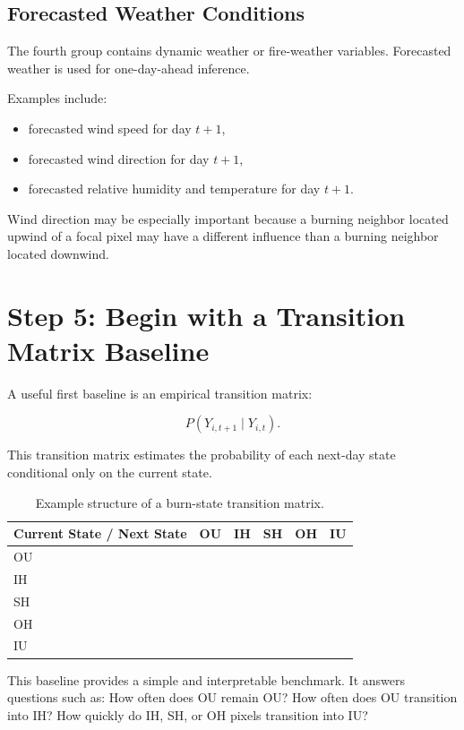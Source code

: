 \documentclass[11pt]{article}
\begin{document}
\subsection*{Forecasted Weather Conditions}

The fourth group contains dynamic weather or fire-weather variables. Forecasted weather is used for one-day-ahead inference.

Examples include:

\begin{itemize}
    \item forecasted wind speed for day $t+1$,
    \item forecasted wind direction for day $t+1$,
    \item forecasted relative humidity and temperature for day $t+1$.
\end{itemize}

Wind direction may be especially important because a burning neighbor located upwind of a focal pixel may have a different influence than a burning neighbor located downwind.

\section{Step 5: Begin with a Transition Matrix Baseline}

A useful first baseline is an empirical transition matrix:

\[
P(Y_{i,t+1} \mid Y_{i,t}).
\]

This transition matrix estimates the probability of each next-day state conditional only on the current state.

\begin{table}[h]
\centering
\caption{Example structure of a burn-state transition matrix.}
\begin{tabular}{lccccc}
\toprule
Current State / Next State & OU & IH & SH & OH & IU \\
\midrule
OU &  &  &  &  &  \\
IH &  &  &  &  &  \\
SH &  &  &  &  &  \\
OH &  &  &  &  &  \\
IU &  &  &  &  &  \\
\bottomrule
\end{tabular}
\end{table}

This baseline provides a simple and interpretable benchmark. It answers questions such as: How often does OU remain OU? How often does OU transition into IH? How quickly do IH, SH, or OH pixels transition into IU?
\end{document}
